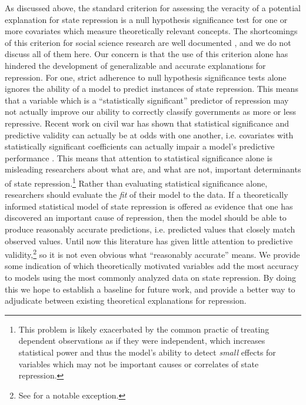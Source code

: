 \documentclass[11pt]{article}
\begin{document}
As discussed above, the standard criterion for assessing the veracity of a potential explanation for state repression is a null hypothesis significance test for one or more covariates which measure theoretically relevant concepts. The shortcomings of this criterion for social science research are well documented \citep[See, e.g.][]{Gill1999}, and we do not discuss all of them here. Our concern is that the use of this criterion alone has hindered the development of generalizable and accurate explanations for repression. For one, strict adherence to null hypothesis significance tests alone ignores the ability of a model to predict instances of state repression. This means that a variable which is a ``statistically significant'' predictor of repression may not actually improve our ability to correctly classify governments as more or less repressive. Recent work on civil war has shown that statistical significance and predictive validity can actually be at odds with one another, i.e. covariates with statistically significant coefficients can actually impair a model's predictive performance \citep{Wardetal2010}. This means that attention to statistical significance alone is misleading researchers about what are, and what are not, important determinants of state repression.\footnote{This problem is likely exacerbated by the common practic of treating dependent observations as if they were independent, which increases statistical power and thus the model's ability to detect {\em small} effects for variables which may not be important causes or correlates of state repression.} Rather than evaluating statistical significance alone, researchers should evaluate the {\em fit} of their model to the data. If a theoretically informed statistical model of state repression is offered as evidence that one has discovered an important cause of repression, then the model should be able to produce reasonably accurate predictions, i.e. predicted values that closely match observed values. Until now this literature has given little attention to predictive validity,\footnote{See \citet{PoeRostCarey2006} for a notable exception.} so it is not even obvious what ``reasonably accurate'' means. We provide some indication of which theoretically motivated variables add the most accuracy to models using the most commonly analyzed data on state repression. By doing this we hope to establish a baseline for future work, and provide a better way to adjudicate between existing theoretical explanations for repression.
\end{document}
